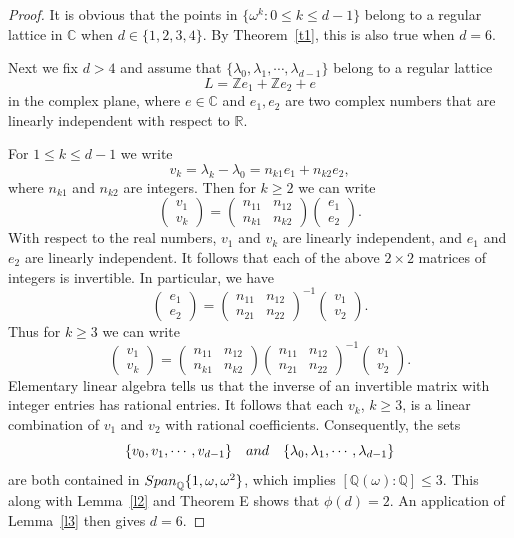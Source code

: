 \documentclass[10pt,a4paper]{amsart}
\newcommand{\C}{\mathbb C}
\newcommand{\Q}{\mathbb Q}
\newcommand{\R}{\mathbb R}
\newcommand{\Z}{\mathbb Z}
\begin{document}
\begin{proof}
It is obvious that the points in $\{\omega^k: 0\le k\le d-1\}$ 
belong to a regular lattice in $\C$ when $d\in\{1,2,3,4\}$. 
By Theorem~\ref{t1}, this is also true when $d=6$.

Next we fix $d>4$ and assume that 
$\{\lambda_0,\lambda_1,\cdots,\lambda_{d-1}\}$ belong 
to a regular lattice
$$L=\Z e_1+\Z e_2+e$$ 
in the complex plane, where $e\in\C$ and $e_1,e_2$ are two 
complex numbers that are linearly independent with respect 
to $\R$.

For $1\le k\le d-1$ we write
$$v_k=\lambda_k-\lambda_0=n_{k1}e_1+n_{k2}e_2,$$
where $n_{k1}$ and $n_{k2}$ are integers. Then for $k\ge2$
we can write
$$\begin{pmatrix}v_1\\ v_k\end{pmatrix}=
\begin{pmatrix}n_{11} & n_{12}\\ n_{k1} & n_{k2}\end{pmatrix}
\begin{pmatrix}e_1\\ e_2\end{pmatrix}.$$
With respect to the real numbers, $v_1$ and $v_k$ are linearly
independent, and $e_1$ and $e_2$ are linearly independent. It
follows that each of the above $2\times2$ matrices of integers
is invertible. In particular, we have
$$\begin{pmatrix}e_1\\ e_2\end{pmatrix}=\begin{pmatrix}
n_{11} & n_{12}\\ n_{21} & n_{22}\end{pmatrix}^{-1}
\begin{pmatrix}v_1\\ v_2\end{pmatrix}.$$
Thus for $k\ge3$ we can write
$$\begin{pmatrix}v_1\\ v_k\end{pmatrix}=\begin{pmatrix}
n_{11} & n_{12}\\ n_{k1} & n_{k2}\end{pmatrix}
\begin{pmatrix}n_{11} & n_{12}\\ n_{21} & n_{22}\end{pmatrix}^{-1}
\begin{pmatrix}v_1 \\ v_2\end{pmatrix}.$$
Elementary linear algebra tells us that the inverse of an invertible
matrix with integer entries has rational entries. It follows that each
$v_k$, $k\ge3$, is a linear combination of $v_1$ and $v_2$ with
rational coefficients. Consequently, the sets 
$$\{v_0, v_1,\cdots, v_{d-1}\}\quad{\rm and}\quad
\{\lambda_0,\lambda_1,\cdots,\lambda_{d-1}\}$$ 
are both contained in ${\rm Span}_{\Q}\{1,\omega,\omega^2\}$,
which implies $\left[\Q(\omega) : \Q\right]\le3$. This along with
Lemma~\ref{l2} and Theorem E shows that $\phi(d)=2$. An
application of Lemma~\ref{l3} then gives $d=6$.
\end{proof}
\end{document}
